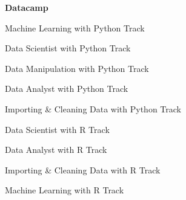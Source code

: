 \begin{cventries}
 \cventry
 {\bf Datacamp }
 {}
 {}
 {}
    {
      \begin{cvitems} %
        \item {Machine Learning with Python Track }
        \item {Data Scientist with Python Track }
        \item {Data Manipulation with Python Track }
        \item {Data Analyst with Python Track }
        \item {Importing \& Cleaning Data with Python Track }
        \item {Data Scientist with R Track }
        \item {Data Analyst with R Track }
        \item {Importing \& Cleaning Data with R Track }
        \item {Machine Learning with R Track }
      \end{cvitems}
    }
\end{cventries}
